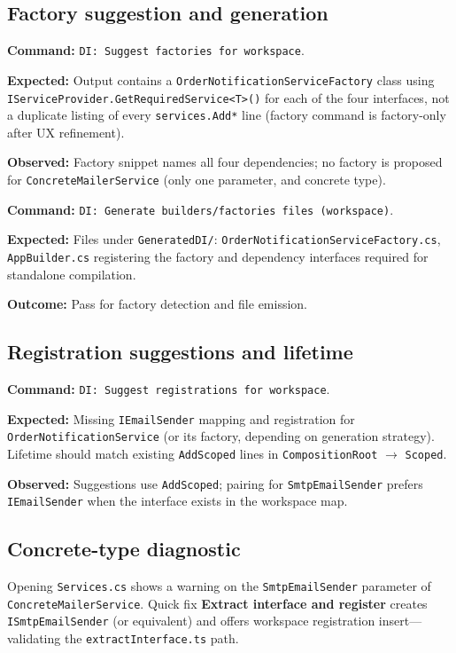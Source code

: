 \subsection{Factory suggestion and generation}

\textbf{Command:} \texttt{DI: Suggest factories for workspace}.

\textbf{Expected:} Output contains a \texttt{OrderNotificationServiceFactory} class using \texttt{IServiceProvider.GetRequiredService<T>()} for each of the four interfaces, not a duplicate listing of every \texttt{services.Add*} line (factory command is factory-only after UX refinement).

\textbf{Observed:} Factory snippet names all four dependencies; no factory is proposed for \texttt{ConcreteMailerService} (only one parameter, and concrete type).

\textbf{Command:} \texttt{DI: Generate builders/factories files (workspace)}.

\textbf{Expected:} Files under \texttt{GeneratedDI/}: \texttt{OrderNotificationServiceFactory.cs}, \texttt{AppBuilder.cs} registering the factory and dependency interfaces required for standalone compilation.

\textbf{Outcome:} Pass for factory detection and file emission.

\subsection{Registration suggestions and lifetime}

\textbf{Command:} \texttt{DI: Suggest registrations for workspace}.

\textbf{Expected:} Missing \texttt{IEmailSender} mapping and registration for \texttt{OrderNotificationService} (or its factory, depending on generation strategy). Lifetime should match existing \texttt{AddScoped} lines in \texttt{CompositionRoot} $\rightarrow$ \texttt{Scoped}.

\textbf{Observed:} Suggestions use \texttt{AddScoped}; pairing for \texttt{SmtpEmailSender} prefers \texttt{IEmailSender} when the interface exists in the workspace map.

\subsection{Concrete-type diagnostic}

Opening \texttt{Services.cs} shows a warning on the \texttt{SmtpEmailSender} parameter of \texttt{ConcreteMailerService}. Quick fix \textbf{Extract interface and register} creates \texttt{ISmtpEmailSender} (or equivalent) and offers workspace registration insert---validating the \texttt{extractInterface.ts} path.

